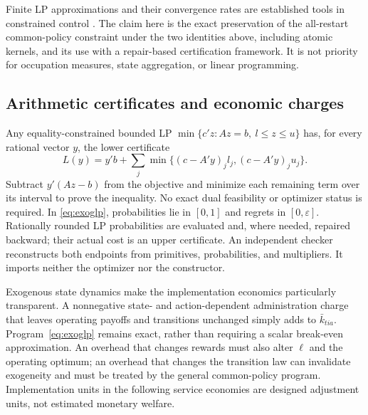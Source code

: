 Finite LP approximations and their convergence rates are established tools in constrained control \citep{DufourPrietoRumeau2013,Saldi2018}. The claim here is the exact preservation of the all-restart common-policy constraint under the two identities above, including atomic kernels, and its use with a repair-based certification framework. It is not priority for occupation measures, state aggregation, or linear programming.

\subsection{Arithmetic certificates and economic charges}\label{sec:exogcertificate}
Any equality-constrained bounded LP $\min\{c'z:Az=b,\ l\leq z\leq u\}$ has, for every rational vector $y$, the lower certificate
\begin{equation}\label{eq:equalitydual}
 L(y)=y'b+\sum_j\min\{(c-A'y)_jl_j,(c-A'y)_ju_j\}.
\end{equation}
Subtract $y'(Az-b)$ from the objective and minimize each remaining term over its interval to prove the inequality. No exact dual feasibility or optimizer status is required. In \eqref{eq:exoglp}, probabilities lie in $[0,1]$ and regrets in $[0,\varepsilon]$. Rationally rounded LP probabilities are evaluated and, where needed, repaired backward; their actual cost is an upper certificate. An independent checker reconstructs both endpoints from primitives, probabilities, and multipliers. It imports neither the optimizer nor the constructor.

Exogenous state dynamics make the implementation economics particularly transparent. A nonnegative state- and action-dependent administration charge that leaves operating payoffs and transitions unchanged simply adds to $\bar k_{tia}$. Program~\eqref{eq:exoglp} remains exact, rather than requiring a scalar break-even approximation. An overhead that changes rewards must also alter $\ell$ and the operating optimum; an overhead that changes the transition law can invalidate exogeneity and must be treated by the general common-policy program. Implementation units in the following service economies are designed adjustment units, not estimated monetary welfare.
